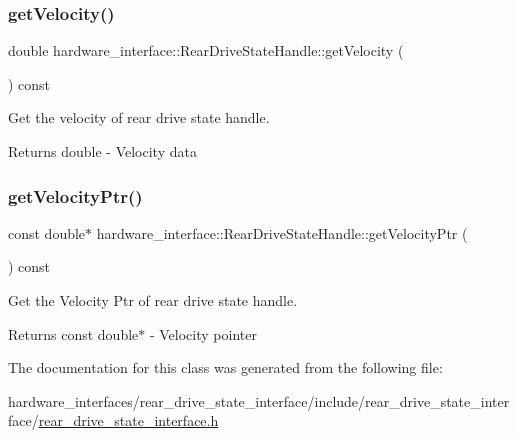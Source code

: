 \subsubsection{\texorpdfstring{get\+Velocity()}{getVelocity()}}
{\footnotesize\ttfamily double hardware\+\_\+interface\+::\+Rear\+Drive\+State\+Handle\+::get\+Velocity (\begin{DoxyParamCaption}{ }\end{DoxyParamCaption}) const\hspace{0.3cm}{\ttfamily [inline]}}



Get the velocity of rear drive state handle. 

\begin{DoxyReturn}{Returns}
double -\/ Velocity data 
\end{DoxyReturn}
\mbox{\label{classhardware__interface_1_1RearDriveStateHandle_aaac1ccae17568c0107f88a7165a236ba}} 
\subsubsection{\texorpdfstring{get\+Velocity\+Ptr()}{getVelocityPtr()}}
{\footnotesize\ttfamily const double$\ast$ hardware\+\_\+interface\+::\+Rear\+Drive\+State\+Handle\+::get\+Velocity\+Ptr (\begin{DoxyParamCaption}{ }\end{DoxyParamCaption}) const\hspace{0.3cm}{\ttfamily [inline]}}



Get the Velocity Ptr of rear drive state handle. 

\begin{DoxyReturn}{Returns}
const double$\ast$ -\/ Velocity pointer 
\end{DoxyReturn}


The documentation for this class was generated from the following file\+:\begin{DoxyCompactItemize}
\item 
hardware\+\_\+interfaces/rear\+\_\+drive\+\_\+state\+\_\+interface/include/rear\+\_\+drive\+\_\+state\+\_\+interface/\hyperlink{rear__drive__state__interface_8h}{rear\+\_\+drive\+\_\+state\+\_\+interface.\+h}\end{DoxyCompactItemize}
